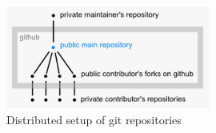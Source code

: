 \begin{figure}[htb]
	\centering
	\includegraphics[width=0.6\textwidth]{prestudy/github.jpg}
	\caption{Distributed setup of git repositories}
	\label{fig:github}
\end{figure}

\newpage
